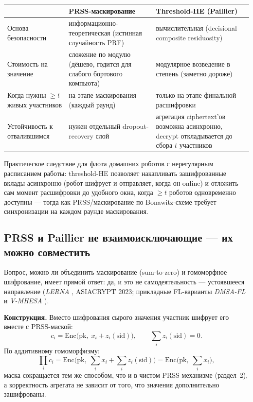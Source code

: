 \documentclass[11pt]{article}
\begin{document}
\begin{center}
\begin{tabular}{@{}p{3.4cm}p{5.6cm}p{5.6cm}@{}}
\toprule
 & PRSS-маскирование & Threshold-HE (Paillier) \\
\midrule
Основа безопасности & информационно-теоретическая (истинная случайность PRF) &
  вычислительная (decisional composite residuosity) \\
Стоимость на значение & сложение по модулю (дёшево, годится для слабого бортового
  компьюта) & модулярное возведение в степень (заметно дороже) \\
Когда нужны $\ge t$ живых участников & на этапе маскирования (каждый раунд) & только
  на этапе финальной расшифровки \\
Устойчивость к отвалившимся & нужен отдельный dropout-recovery слой & агрегация
  ciphertext'ов возможна асинхронно, decrypt откладывается до сбора $t$ участников \\
\bottomrule
\end{tabular}
\end{center}

Практическое следствие для флота домашних роботов с нерегулярным расписанием
работы: threshold-HE позволяет накапливать зашифрованные вклады асинхронно (робот
шифрует и отправляет, когда он online) и отложить сам момент расшифровки до
удобного окна, когда $\ge t$ роботов одновременно доступны — тогда как
PRSS/маскирование по Bonawitz-схеме требует синхронизации на каждом раунде
маскирования.

\subsection*{PRSS и Paillier не взаимоисключающие — их можно совместить}

Вопрос, можно ли объединить маскирование (sum-to-zero) и гомоморфное шифрование,
имеет прямой ответ: да, и это не самодеятельность — устоявшееся направление
(\emph{LERNA} \cite{lerna2023}, ASIACRYPT 2023; прикладные FL-варианты
\emph{DMSA-FL} \cite{dmsafl2026} и \emph{V-MHESA} \cite{vmhesa2025}).

\textbf{Конструкция.} Вместо шифрования сырого значения участник шифрует его вместе
с PRSS-маской:
\[
  c_i = \mathrm{Enc}\big(\mathrm{pk},\; x_i + z_i(\mathrm{sid})\big), \qquad
  \sum_i z_i(\mathrm{sid}) = 0.
\]
По аддитивному гомоморфизму:
\[
  \prod_i c_i = \mathrm{Enc}\Big(\mathrm{pk},\; \sum_i x_i + \sum_i z_i(\mathrm{sid})\Big)
  = \mathrm{Enc}\Big(\mathrm{pk},\; \sum_i x_i\Big),
\]
маска сокращается тем же способом, что и в чистом PRSS-механизме (раздел~2), а
корректность агрегата не зависит от того, что значения дополнительно зашифрованы.
\end{document}
